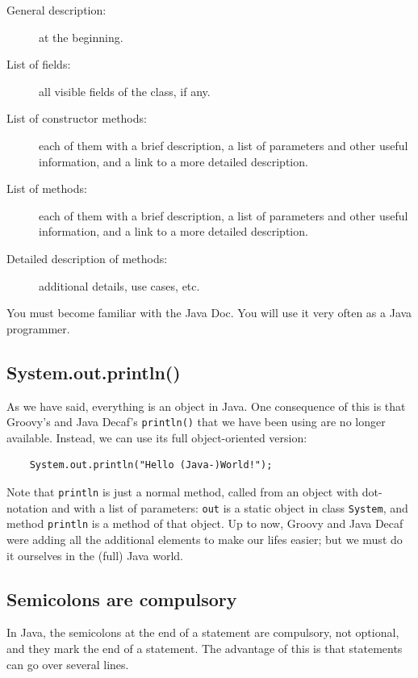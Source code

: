 \begin{description}
\item[General description:] at the beginning.
\item[List of fields:] all visible fields of the class, if any.
\item[List of constructor methods:] each of them with a brief
  description, a list of parameters and other useful information, and
  a link to a more detailed description.
\item[List of methods:] each of them with a brief
  description, a list of parameters and other useful information, and
  a link to a more detailed description.
\item[Detailed description of methods:] additional details, use cases,
  etc. 
\end{description}

You must become familiar with the Java Doc. You will use it very often
as a Java programmer. 

\subsection{System.out.println()}
\label{sec:system.out.println}

As we have said, everything is an object in Java. One consequence of
this is
that Groovy's and Java Decaf's \verb+println()+
that we have been using are no 
longer available. Instead, we can use its full object-oriented
version: 

\begin{verbatim}
    System.out.println("Hello (Java-)World!");
\end{verbatim}

Note that \verb+println+ is just a normal method, called from an
object with dot-notation and with a list of parameters: \verb+out+ is
a static object in class \verb+System+, and method \verb+println+ is a
method of that object.
Up to now, Groovy and Java Decaf were adding all the additional elements to make our
lifes easier; but we must do it ourselves in the (full) Java world. 

\subsection{Semicolons are compulsory}
\label{sec:semic-are-comp}

In Java, the semicolons at the end of a statement are compulsory, not
optional, and they mark the end of a statement. 
The advantage of this is that statements can go over several lines. 

